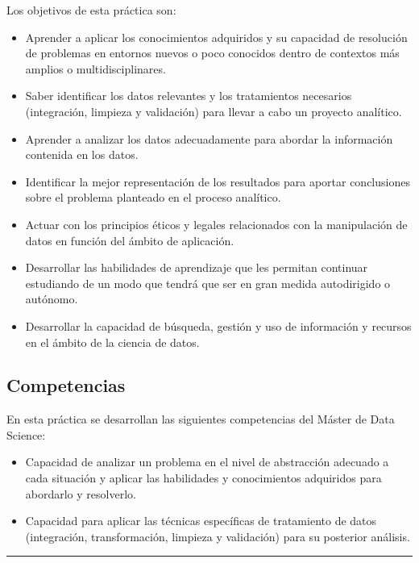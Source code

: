 \documentclass[11pt]{article}
\begin{document}
Los objetivos de esta práctica son:

\begin{itemize}
\item
  Aprender a aplicar los conocimientos adquiridos y su capacidad de
  resolución de problemas en entornos nuevos o poco conocidos dentro de
  contextos más amplios o multidisciplinares.
\item
  Saber identificar los datos relevantes y los tratamientos necesarios
  (integración, limpieza y validación) para llevar a cabo un proyecto
  analítico.
\item
  Aprender a analizar los datos adecuadamente para abordar la
  información contenida en los datos.
\item
  Identificar la mejor representación de los resultados para aportar
  conclusiones sobre el problema planteado en el proceso analítico.
\item
  Actuar con los principios éticos y legales relacionados con la
  manipulación de datos en función del ámbito de aplicación.
\item
  Desarrollar las habilidades de aprendizaje que les permitan continuar
  estudiando de un modo que tendrá que ser en gran medida autodirigido o
  autónomo.
\item
  Desarrollar la capacidad de búsqueda, gestión y uso de información y
  recursos en el ámbito de la ciencia de datos.
\end{itemize}

\hypertarget{competencias}{%
\subsection{Competencias}\label{competencias}}

En esta práctica se desarrollan las siguientes competencias del Máster
de Data Science:

\begin{itemize}
\item
  Capacidad de analizar un problema en el nivel de abstracción adecuado
  a cada situación y aplicar las habilidades y conocimientos adquiridos
  para abordarlo y resolverlo.
\item
  Capacidad para aplicar las técnicas específicas de tratamiento de
  datos (integración, transformación, limpieza y validación) para su
  posterior análisis.
\end{itemize}

    \begin{center}\rule{0.5\linewidth}{0.5pt}\end{center}
\end{document}
